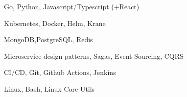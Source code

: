 \item Go, Python, Javascript/Typescript (+React)
\item Kubernetes, Docker, Helm, Krane
\item MongoDB,PostgreSQL, Redis
\item Microservice design patterns, Sagas, Event Sourcing, CQRS
\item CI/CD, Git, Github Actions, Jenkins
\item Linux, Bash, Linux Core Utils
